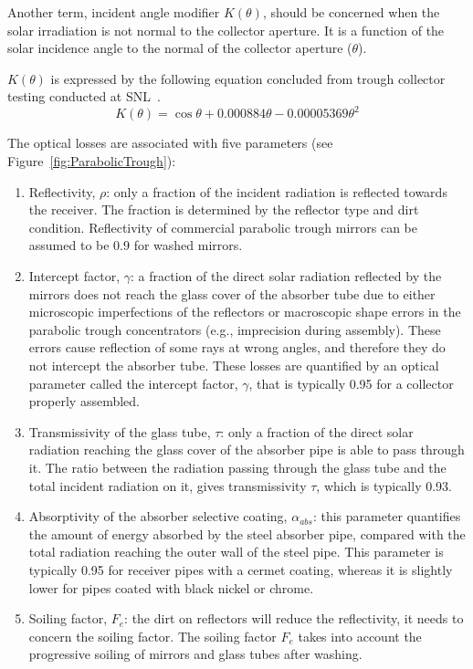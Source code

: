 Another term, incident angle modifier $K(\theta)$, should be concerned when the solar irradiation is not normal to the collector aperture. It is a function of the solar incidence angle to the normal of the collector aperture ($\theta$).

$K(\theta)$ is expressed by the following equation concluded from trough collector testing conducted at SNL~\cite{Dudley1994}.
\begin{equation}
  K(\theta) = \cos\theta+0.000884\theta-0.00005369\theta^2
\end{equation}

The optical losses are associated with five parameters (see Figure~\ref{fig:ParabolicTrough}):

\begin{enumerate}[label=(\arabic*)]
  \item Reflectivity, $\rho$: only a fraction of the incident radiation is reflected towards the receiver. The fraction is determined by the reflector type and dirt condition. Reflectivity of commercial parabolic trough mirrors can be assumed to be 0.9 for washed mirrors. 
  \item Intercept factor, $\gamma$: a fraction of the direct solar radiation reflected by the mirrors does not reach the glass cover of the absorber tube due to either microscopic imperfections of the reflectors or macroscopic shape errors in the parabolic trough concentrators (e.g., imprecision during assembly). These errors cause reflection of some rays at wrong angles, and therefore they do not intercept the absorber tube. These losses are quantified by an optical parameter called the intercept factor, $\gamma$, that is typically 0.95 for a collector properly assembled.
  \item Transmissivity of the glass tube, $\tau$: only a fraction of the direct solar radiation reaching the glass cover of the absorber pipe is able to pass through it. The ratio between the radiation passing through the glass tube and the total incident radiation on it, gives transmissivity $\tau$,  which is typically 0.93.
  \item Absorptivity of the absorber selective coating, $\alpha_{abs}$: this parameter quantifies the amount of energy absorbed by the steel absorber pipe, compared with the total radiation reaching the outer wall of the steel pipe. This parameter is typically 0.95 for receiver pipes with a cermet coating, whereas it is slightly lower for pipes coated with black nickel or chrome.
  \item Soiling factor, $F_e$: the dirt on reflectors will reduce the reflectivity, it needs to concern the soiling factor. The soiling factor $F_e$ takes into account the progressive soiling of mirrors and glass tubes after washing.
\end{enumerate}

